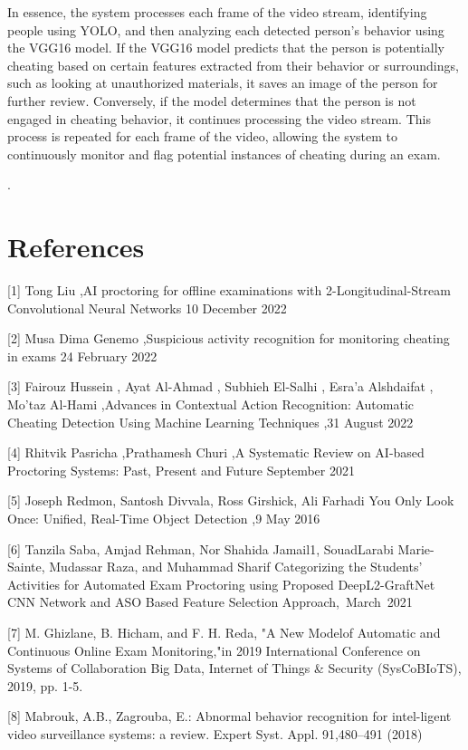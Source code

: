 \documentclass[conference]{IEEEtran}
\begin{document}
In essence, the system processes each frame of the video stream, identifying people using YOLO, and then analyzing each detected person's behavior using the VGG16 model. If the VGG16 model predicts that the person is potentially cheating based on certain features extracted from their behavior or surroundings, such as looking at unauthorized materials, it saves an image of the person for further review. Conversely, if the model determines that the person is not engaged in cheating behavior, it continues processing the video stream. This process is repeated for each frame of the video, allowing the system to continuously monitor and flag potential instances of cheating during an exam.

. 

\section*{References}
[1] Tong Liu ,AI proctoring for offline examinations with 2-Longitudinal-Stream
    Convolutional Neural Networks 10 December 2022
 
[2] Musa Dima Genemo ,Suspicious activity recognition for monitoring cheating in     exams 24 February 2022

[3] Fairouz Hussein , Ayat Al-Ahmad , Subhieh El-Salhi , Esra’a Alshdaifat ,         Mo’taz Al-Hami ,Advances in  Contextual Action Recognition: Automatic 
     Cheating Detection Using Machine Learning Techniques ,31 August 2022

[4] Rhitvik Pasricha ,Prathamesh Churi ,A Systematic Review on AI-based      
    Proctoring Systems: Past, Present  and Future September 2021
    
[5] Joseph Redmon, Santosh Divvala, Ross Girshick, Ali Farhadi You Only   
     Look Once: Unified, Real-Time Object Detection ,9 May 2016

[6] Tanzila Saba, Amjad Rehman, Nor Shahida Jamail1, SouadLarabi Marie-Sainte,
     Mudassar Raza, and Muhammad Sharif Categorizing the Students’ Activities for
     Automated Exam Proctoring using Proposed DeepL2-GraftNet CNN Network and ASO Based Feature Selection Approach, March 2021

[7]  M. Ghizlane, B. Hicham, and F. H. Reda, "A New Modelof Automatic and             Continuous Online Exam Monitoring,"in 2019 International Conference on 
     Systems of Collaboration Big Data, Internet of Things & Security
    (SysCoBIoTS), 2019, pp. 1-5.

[8]  Mabrouk, A.B., Zagrouba, E.: Abnormal behavior recognition for 
    intel-ligent video surveillance systems: a review. Expert Syst. Appl.
     91,480–491 (2018)
\end{document}
